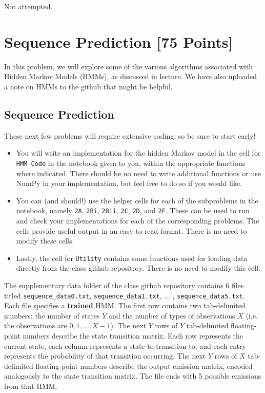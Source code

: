 \begin{solution}
  Not attempted.
\end{solution}


\newpage
\section{Sequence Prediction [75 Points]}

In this problem, we will explore some of the various algorithms associated with Hidden Markov Models (HMMs), as discussed in lecture.
We have also uploaded a note on HMMs to the github that might be helpful.

\subsection{Sequence Prediction}

These next few problems will require extensive coding, so be sure to start early! 
\begin{itemize}
  \item You will write an implementation for the hidden Markov model in the cell for \texttt{HMM Code} in the notebook given to you, within the appropriate functions where indicated. There should be no need to write additional functions or use NumPy in your implementation, but feel free to do so if you would like.
  \item You can (and should!) use the helper cells for each of the subproblems in the notebook, namely \texttt{2A}, \texttt{2Bi}, \texttt{2Bii}, \texttt{2C}, \texttt{2D}, and \texttt{2F}. These can be used to run and check your implementations for each of the corresponding problems. The cells provide useful output in an easy-to-read format. There is no need to modify these cells.
  \item Lastly, the cell for \texttt{Utility} contains some functions used for loading data directly from the class github repository. There is no need to modify this cell. \\
\end{itemize}

The supplementary data folder of the class github repository contains 6 files titled \texttt{sequence_data0.txt}, \texttt{sequence_data1.txt}, ... , \texttt{sequence_data5.txt}. Each file specifies a \textbf{trained} HMM. The first row contains two tab-delimited numbers: the number of states $Y$ and the number of types of observations $X$ (i.e. the observations are $0, 1, . . . , X - 1$). The next $Y$ rows of $Y$ tab-delimited floating-point numbers describe the state transition matrix. Each row represents the current state, each column represents a state to transition to, and each entry represents the probability of that transition occurring. The next $Y$ rows of $X$ tab-delimited floating-point numbers describe the output emission matrix, encoded analogously to the state transition matrix. The file ends with 5 possible emissions from that HMM. \\

